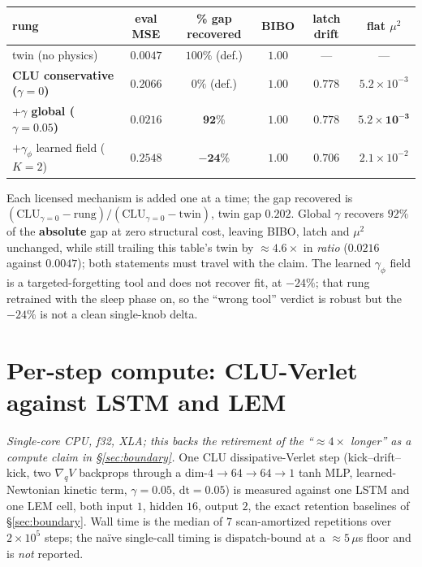 \documentclass{article}
\begin{document}
\begin{center}\footnotesize
\begin{tabular}{lccccc}
\toprule
rung & eval MSE & \textbf{\% gap recovered} & BIBO & latch drift & flat $\mu^2$ \\
\midrule
twin (no physics) & $0.0047$ & $100\%$ (def.) & $1.00$ & --- & --- \\
\textbf{CLU conservative ($\gamma=0$)} & $0.2066$ & $0\%$ (def.) & $1.00$ & $0.778$ & $5.2{\times}10^{-3}$ \\
\textbf{$+\gamma$ global ($\gamma=0.05$)} & $0.0216$ & $\mathbf{92\%}$ & $\mathbf{1.00}$ & $\mathbf{0.778}$ & $\mathbf{5.2{\times}10^{-3}}$ \\
$+\gamma_\phi$ learned field ($K=2$) & $0.2548$ & $\mathbf{-24\%}$ & $1.00$ & $0.706$ & $2.1{\times}10^{-2}$ \\
\bottomrule
\end{tabular}
\end{center}

Each licensed mechanism is added one at a time; the gap recovered is $(\mathrm{CLU}_{\gamma=0}-\mathrm{rung})/(\mathrm{CLU}_{\gamma=0}-\mathrm{twin})$, twin gap $0.202$. Global $\gamma$ recovers $92\%$ of the \textbf{absolute} gap at zero structural cost, leaving BIBO, latch and $\mu^2$ unchanged, while still trailing this table's twin by $\approx4.6\times$ in \emph{ratio} ($0.0216$ against $0.0047$); both statements must travel with the claim. The learned $\gamma_\phi$ field is a targeted-forgetting tool and does not recover fit, at $-24\%$; that rung retrained with the sleep phase on, so the ``wrong tool'' verdict is robust but the $-24\%$ is not a clean single-knob delta.

\section{Per-step compute: CLU-Verlet against LSTM and LEM}\label{app:compute}

\emph{Single-core CPU, f32, XLA; this backs the retirement of the ``$\approx4\times$ longer'' as a compute claim in \S\ref{sec:boundary}.} One CLU dissipative-Verlet step (kick--drift--kick, two $\nabla_qV$ backprops through a dim-$4{\to}64{\to}64{\to}1$ tanh MLP, learned-Newtonian kinetic term, $\gamma{=}0.05$, $\mathrm{dt}{=}0.05$) is measured against one LSTM and one LEM cell, both input $1$, hidden $16$, output $2$, the exact retention baselines of \S\ref{sec:boundary}. Wall time is the median of $7$ scan-amortized repetitions over $2{\times}10^5$ steps; the na\"ive single-call timing is dispatch-bound at a $\approx5\,\mu$s floor and is \emph{not} reported.
\end{document}
